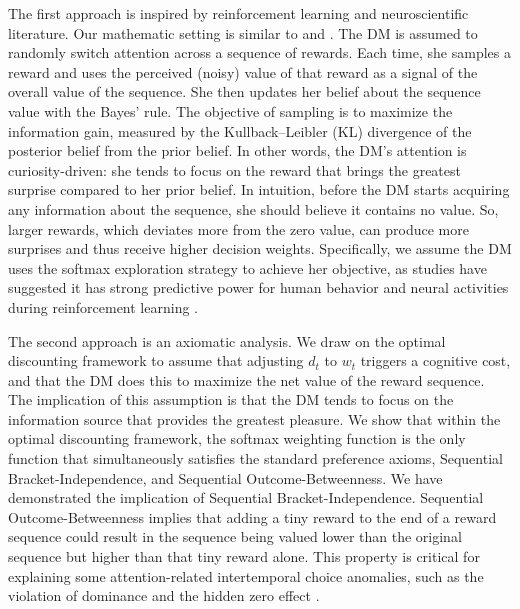 \documentclass[
  12pt,
]{article}
\begin{document}
The first approach is inspired by reinforcement learning and
neuroscientific literature. Our mathematic setting is similar to
\citet{itti2009bayesian} and \citet{gottlieb2013information}. The DM is
assumed to randomly switch attention across a sequence of rewards. Each
time, she samples a reward and uses the perceived (noisy) value of that
reward as a signal of the overall value of the sequence. She then
updates her belief about the sequence value with the Bayes' rule. The
objective of sampling is to maximize the information gain, measured by
the Kullback--Leibler (KL) divergence of the posterior belief from the
prior belief. In other words, the DM's attention is curiosity-driven:
she tends to focus on the reward that brings the greatest surprise
compared to her prior belief. In intuition, before the DM starts
acquiring any information about the sequence, she should believe it
contains no value. So, larger rewards, which deviates more from the zero
value, can produce more surprises and thus receive higher decision
weights. Specifically, we assume the DM uses the softmax exploration
strategy to achieve her objective, as studies have suggested it has
strong predictive power for human behavior and neural activities during
reinforcement learning \citep{daw2006cortical, collins2014opponent} .

The second approach is an axiomatic analysis. We draw on the optimal
discounting framework \citep{noor2022optimal,noor2024constrained} to
assume that adjusting \(d_t\) to \(w_t\) triggers a cognitive cost, and
that the DM does this to maximize the net value of the reward sequence.
The implication of this assumption is that the DM tends to focus on the
information source that provides the greatest pleasure. We show that
within the optimal discounting framework, the softmax weighting function
is the only function that simultaneously satisfies the standard
preference axioms, Sequential Bracket-Independence, and Sequential
Outcome-Betweenness. We have demonstrated the implication of Sequential
Bracket-Independence. Sequential Outcome-Betweenness implies that adding
a tiny reward to the end of a reward sequence could result in the
sequence being valued lower than the original sequence but higher than
that tiny reward alone. This property is critical for explaining some
attention-related intertemporal choice anomalies, such as the violation
of dominance \citep{scholten2014better, jiang2017better} and the hidden
zero effect
\citep{magen2008hidden, radu2011mechanism, read2017value, dang2021beauty}.
\end{document}
